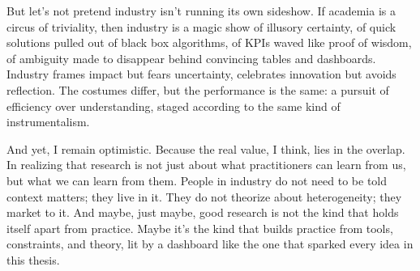 But let’s not pretend industry isn’t running its own sideshow. If academia is a circus of triviality, then industry is a magic show of illusory certainty, of quick solutions pulled out of black box algorithms, of KPIs waved like proof of wisdom, of ambiguity made to disappear behind convincing tables and dashboards. Industry frames impact but fears uncertainty, celebrates innovation but avoids reflection. The costumes differ, but the performance is the same: a pursuit of efficiency over understanding, staged according to the same kind of instrumentalism.

And yet, I remain optimistic. Because the real value, I think, lies in the overlap. In realizing that research is not just about what practitioners can learn from us, but what we can learn from them. People in industry do not need to be told context matters; they live in it. They do not theorize about heterogeneity; they market to it. And maybe, just maybe, good research is not the kind that holds itself apart from practice. Maybe it’s the kind that builds practice from tools, constraints, and theory, lit by a dashboard like the one that sparked every idea in this thesis.
